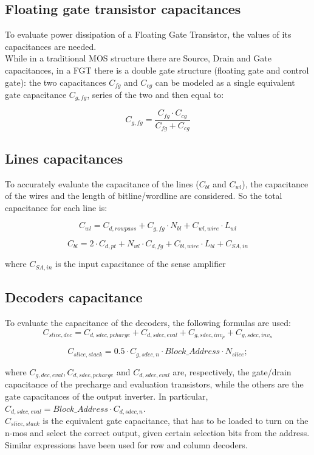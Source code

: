 \subsection{Floating gate transistor capacitances}

To evaluate power dissipation of a Floating Gate Transistor, the values of its capacitances are needed.\\
While in a traditional MOS structure there are Source, Drain and Gate capacitances, in a FGT there is a double gate structure (floating gate and control gate): the two capacitances $C_{fg}$ and $C_{cg}$ can be modeled as a single equivalent gate capacitance $C_{g,fg}$, series of the two and then equal to:

\[
C_{g,fg}=\frac{C_{fg} \cdot C_{cg}}{C_{fg}+C_{cg}}
\]

\subsection{Lines capacitances}
\label{subsec:capacitance}

To accurately evaluate the capacitance of the lines ($C_{bl}$ and $C_{wl}$), the capacitance of the wires  and the length of bitline/wordline are considered. So the total capacitance for each line is:

\[
C_{wl} = C_{d,rowpass} + C_{g,fg} \cdot N_{bl} + C_{wl,wire} \cdot L_{wl}
\]

\[
C_{bl}=2 \cdot C_{d,pt}+N_{wl}\cdot C_{d,fg}+C_{bl,wire} \cdot L_{bl} +C_{SA,in}
\]

where $C_{SA,in}$ is the input capacitance of the sense amplifier
\subsection{Decoders capacitance}
\label{subsec:dec_capacitance}
To evaluate the capacitance of the decoders, the following formulas are used:
\[
C_{slice,dec}=C_{d,sdec,pcharge}+C_{d,sdec,eval}+C_{g,sdec,inv_{p}}+C_{g,sdec,inv_{n}}
\]

\[
C_{slice,stack}=0.5 \cdot C_{g,sdec,n} \cdot Block\_Address \cdot N_{slice};
\]

where $C_{g,dec,eval}, C_{d,sdec,pcharge}$ and $C_{d,sdec,eval}$ are, respectively, the gate/drain capacitance of the precharge and evaluation transistors, while the others are the gate capacitances of the output inverter.
In particular, $C_{d,sdec,eval} = Block\_Address \cdot C_{d,sdec,n}$.\\
$C_{slice,stack}$ is the equivalent gate capacitance, that has to be loaded to turn on the n-mos and select the correct output, given certain selection bits from the address.\\
Similar expressions have been used for row and column decoders.
